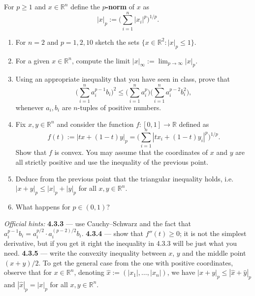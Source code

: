 \begin{exercise}
\label{ex:4.3}
For $p \geq 1$ and $x \in \mathbb{R}^n$ define the \textbf{$p$-norm} of $x$ as
$$|x|_p := \Big(\sum_{i=1}^{n} |x_i|^p\Big)^{1/p}.$$
\begin{enumerate}[label=\textbf{\arabic*.}]
  \item For $n = 2$ and $p = 1, 2, 10$ sketch the sets $\{x \in \mathbb{R}^2 : |x|_p \leq 1\}$.
  \item For a given $x \in \mathbb{R}^n$, compute the limit
    $|x|_\infty := \lim_{p\to\infty}|x|_p$.
  \item Using an appropriate inequality that you have seen in class, prove that
    $$\Big(\sum_{i=1}^{n} a_i^{p-1}b_i\Big)^2 \leq \Big(\sum_{i=1}^{n}a_i^p\Big)\Big(\sum_{i=1}^{n}a_i^{p-2}b_i^2\Big),$$
    whenever $a_i, b_i$ are $n$-tuples of positive numbers.
  \item Fix $x, y \in \mathbb{R}^n$ and consider the function $f : [0,1] \to \mathbb{R}$ defined
    as
    \begin{equation*}
    f(t) := |tx + (1-t)y|_p = \Big(\sum_{i=1}^{n}|tx_i + (1-t)y_i|^p\Big)^{1/p}. \tag{1}
    \end{equation*}
    Show that $f$ is convex. You may assume that the coordinates of $x$ and $y$ are all strictly
    positive and use the inequality of the previous point.
  \item Deduce from the previous point that the triangular inequality holds, i.e.\
    $|x+y|_p \leq |x|_p + |y|_p$ for all $x,y \in \mathbb{R}^n$.
  \item What happens for $p \in (0,1)$?
\end{enumerate}
\textit{Official hints:} \textbf{4.3.3} --- use Cauchy--Schwarz and the fact that
$a_i^{p-1}b_i = a_i^{p/2}\cdot a_i^{(p-2)/2}b_i$. \textbf{4.3.4} --- show that $f''(t) \geq 0$; it
is not the simplest derivative, but if you get it right the inequality in 4.3.3 will be just what
you need. \textbf{4.3.5} --- write the convexity inequality between $x$, $y$ and the middle point
$(x+y)/2$. To get the general case from the one with positive coordinates, observe that for
$x \in \mathbb{R}^n$, denoting $\hat x := (|x_1|,\dots,|x_n|)$, we have
$|x+y|_p \leq |\hat x + \hat y|_p$ and $|\hat x|_p = |x|_p$ for all $x,y \in \mathbb{R}^n$.
\end{exercise}

